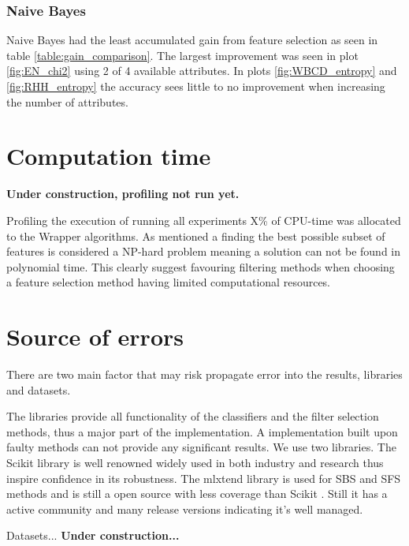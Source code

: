 \subsubsection{Naive Bayes}

Naive Bayes had the least accumulated gain from feature selection as seen in table \ref{table:gain_comparison}. The largest improvement was seen in plot \ref{fig:EN_chi2} using 2 of 4 available attributes. In plots \ref{fig:WBCD_entropy} and \ref{fig:RHH_entropy} the accuracy sees little to no improvement when increasing the number of attributes.




\section{Computation time}

\textbf{Under construction, profiling not run yet.}

Profiling the execution of running all experiments X\% of CPU-time was allocated to the Wrapper algorithms. As mentioned a finding the best possible subset of features is considered a NP-hard problem meaning a solution can not be found in polynomial time. This clearly suggest favouring filtering methods when choosing a feature selection method having limited computational resources.

\section{Source of errors}
\label{sec:source_of_errors}

There are two main factor that may risk propagate error into the results, libraries and datasets.

The libraries provide all functionality of the classifiers and the filter selection methods, thus a major part of the implementation. A implementation built upon faulty methods can not provide any significant results. We use two libraries. The Scikit library \parencite{scikit-learn} is well renowned widely used in both industry and research thus inspire confidence in its robustness. The mlxtend library is used for SBS and SFS methods and is still a open source with less coverage than Scikit \parencite{mlextend}. Still it has a active community and many release versions indicating it's well managed.

Datasets... \textbf{Under construction...}

